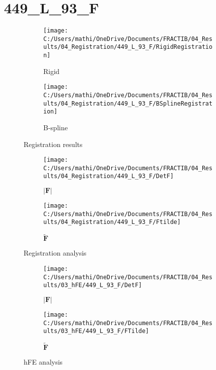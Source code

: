 \documentclass{article}%
\begin{document}
%
\newpage%
\section*{449\_L\_93\_F}%
\label{sec:449L93F}%


\begin{figure}[h!]%
\begin{subfigure}[b]{0.5\linewidth}%
\texttt{[image: C:/Users/mathi/OneDrive/Documents/FRACTIB/04\_Results/04\_Registration/449\_L\_93\_F/RigidRegistration]}%
\caption{Rigid}%
\end{subfigure}%
\begin{subfigure}[b]{0.5\linewidth}%
\texttt{[image: C:/Users/mathi/OneDrive/Documents/FRACTIB/04\_Results/04\_Registration/449\_L\_93\_F/BSplineRegistration]}%
\caption{B{-}spline}%
\end{subfigure}%
\caption{Registration results}%
\end{figure}

%


\begin{figure}[h!]%
\begin{subfigure}[b]{0.5\linewidth}%
\texttt{[image: C:/Users/mathi/OneDrive/Documents/FRACTIB/04\_Results/04\_Registration/449\_L\_93\_F/DetF]}%
\caption{$|\mathbf{F}|$}%
\end{subfigure}%
\begin{subfigure}[b]{0.5\linewidth}%
\texttt{[image: C:/Users/mathi/OneDrive/Documents/FRACTIB/04\_Results/04\_Registration/449\_L\_93\_F/Ftilde]}%
\caption{$\tilde{\mathbf{F}}$}%
\end{subfigure}%
\caption{Registration analysis}%
\end{figure}

%


\begin{figure}[h!]%
\begin{subfigure}[b]{0.5\linewidth}%
\texttt{[image: C:/Users/mathi/OneDrive/Documents/FRACTIB/04\_Results/03\_hFE/449\_L\_93\_F/DetF]}%
\caption{$|\mathbf{F}|$}%
\end{subfigure}%
\begin{subfigure}[b]{0.5\linewidth}%
\texttt{[image: C:/Users/mathi/OneDrive/Documents/FRACTIB/04\_Results/03\_hFE/449\_L\_93\_F/FTilde]}%
\caption{$\tilde{\mathbf{F}}$}%
\end{subfigure}%
\caption{hFE analysis}%
\end{figure}
\end{document}
